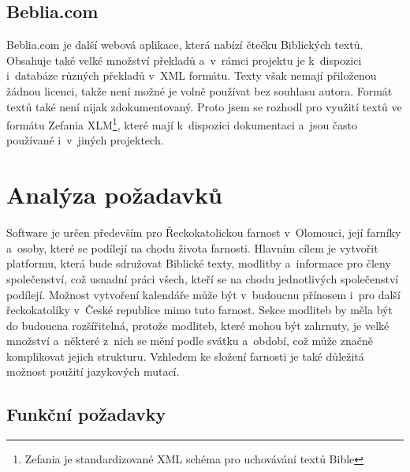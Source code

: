 \documentclass[
  tables=false,
  glossaries,
  index
]{kidiplom}
\begin{document}
\subsection{Beblia.com}
Beblia.com\cite{beblia} je další webová aplikace, která nabízí čtečku Biblických textů. Obsahuje také velké množství překladů a~v~rámci projektu je k~dispozici i~databáze různých překladů v~XML formátu. Texty však nemají přiloženou žádnou licenci, takže není možné je volně používat bez souhlasu autora. Formát textů také není nijak zdokumentovaný. Proto jsem se rozhodl pro využití textů ve formátu Zefania XLM\footnote{Zefania je standardizované XML schéma pro uchovávání textů Bible\cite{zefania}}, které mají k~dispozici dokumentaci a~jsou často používané i~v~jiných projektech.

\section{Analýza požadavků}
Software je určen především pro Řeckokatolickou farnost v~Olomouci, její farníky a~osoby, které se podílejí na chodu života farnosti. Hlavním cílem je vytvořit platformu, která bude sdružovat Biblické texty, modlitby a~informace pro členy společenství, což usnadní práci všech, kteří se na chodu jednotlivých společenství podílejí. Možnost vytvoření kalendáře může být v~budoucnu přínosem i~pro další řeckokatolíky v~České republice mimo tuto farnost. Sekce modliteb by měla být do budoucna rozšířitelná, protože modliteb, které mohou být zahrnuty, je velké množství a~některé z~nich se mění podle svátku a~období, což může značně komplikovat jejich strukturu. Vzhledem ke složení farnosti je také důležitá možnost použití jazykových mutací.

\subsection{Funkční požadavky}
\end{document}
